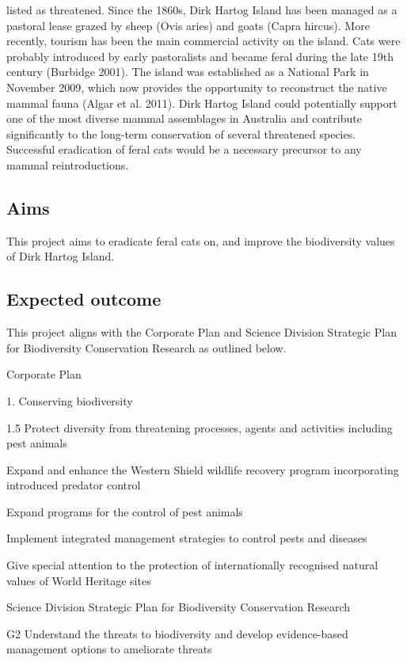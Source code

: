 \documentclass[version=last,
    paper=a4,                               %
    10pt,                                   %
    dvipsnames,
    oneside,                              %
    headings=openany,                       %
    open=any,
    BCOR=7mm,                               %
    DIV=15,     %
]{scrbook}
\begin{document}
listed as threatened. Since the 1860s, Dirk Hartog Island has been
managed as a pastoral lease grazed by sheep (Ovis aries) and goats
(Capra hircus). More recently, tourism has been the main commercial
activity on the island. Cats were probably introduced by early
pastoralists and became feral during the late 19th century (Burbidge
2001). The island was established as a National Park in November 2009,
which now provides the opportunity to reconstruct the native mammal
fauna (Algar et al. 2011). Dirk Hartog Island could potentially support
one of the most diverse mammal assemblages in Australia and contribute
significantly to the long-term conservation of several threatened
species. Successful eradication of feral cats would be a necessary
precursor to any mammal reintroductions.




\subsection*{Aims}

This project aims to eradicate feral cats on, and improve the
biodiversity values of Dirk Hartog Island.




\subsection*{Expected outcome}

This project aligns with the Corporate Plan and Science Division
Strategic Plan for Biodiversity Conservation Research as outlined below.

Corporate Plan

1. Conserving biodiversity

1.5 Protect diversity from threatening processes, agents and activities
including pest animals

Expand and enhance the Western Shield wildlife recovery program
incorporating introduced predator control

Expand programs for the control of pest animals

Implement integrated management strategies to control pests and diseases

Give special attention to the protection of internationally recognised
natural values of World Heritage sites

Science Division Strategic Plan for Biodiversity Conservation Research

G2 Understand the threats to biodiversity and develop evidence-based
management options to ameliorate threats
\end{document}
